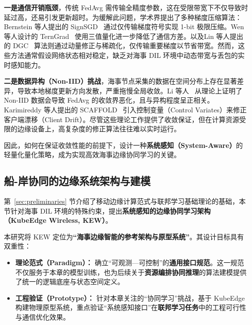 \textbf{一是通信开销瓶颈}，传统 FedAvg 需传输全精度参数，这在受限带宽下不仅导致时延过高，还易引发更新超时。为缓解此问题，学术界提出了多种梯度压缩算法：Bernstein 等人提出的 SignSGD~ 通过仅传输梯度符号实现 1-bit 极限压缩。Wen 等人设计的 TernGrad~ 使用三值量化进一步降低了通信方差。以及Lin 等人提出的 DGC~ 算法则通过动量修正与稀疏化，仅传输重要梯度以节省带宽。然而，这些方法通常假设网络状态相对稳定，缺乏对海事 DIL 环境中动态带宽与丢包的实时感知能力。

\textbf{二是数据异构（Non-IID）挑战}，海事节点采集的数据在空间分布上存在显著差异，导致本地梯度更新方向发散，严重拖慢全局收敛。Li 等人~ 从理论上证明了 Non-IID 数据会导致 FedAvg 的收敛界恶化，且与异构程度呈正相关。Karimireddy 等人提出的 SCAFFOLD~ 引入控制变量（Control Variates）来修正客户端漂移（Client Drift）。尽管这些理论工作提供了收敛保证，但在计算资源受限的边缘设备上，高复杂度的修正算法往往难以实时运行。

因此，如何在保证收敛性能的前提下，设计一种\textbf{系统感知（System-Aware）}的轻量化量化策略，成为实现高效海事边缘协同学习的关键。


\subsection{船-岸协同的边缘系统架构与建模} \label{sec:kew}
第~\ref{sec:preliminaries} 节介绍了移动边缘计算范式与联邦学习基础理论的基础，本节针对海事 DIL 环境的特殊约束，提出\textbf{系统感知的边缘协同学习架构（KubeEdge Wireless, KEW）}。

本研究将 KEW 定位为\textbf{“海事边缘智能的参考架构与原型系统”}。其设计目标具有双重性：
\begin{itemize}
	\item \textbf{理论范式（Paradigm）：} 确立“可观测—可控制”的\textbf{通用接口规范}。这一规范不仅服务于本章的模型训练，也为后续关于\textbf{资源编排协同推理}的算法建模提供了统一的逻辑底座与状态空间定义。
	
	\item \textbf{工程验证（Prototype）：} 针对本章关注的“协同学习”挑战，基于 KubeEdge 构建物理原型系统，重点验证“系统感知接口”在\textbf{联邦学习任务}中的工程可行性与通信优化效果。
\end{itemize}

